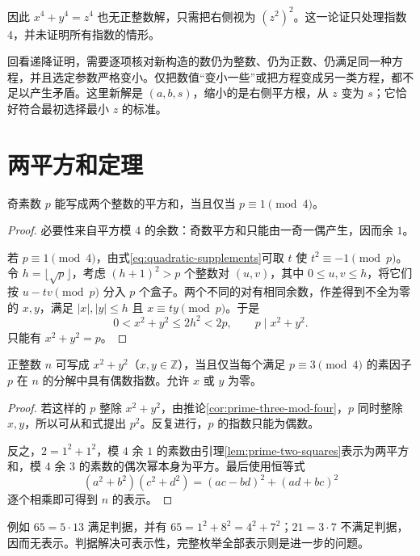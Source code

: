 \documentclass[UTF8,12pt,a4paper,fontset=fandol]{ctexbook}
\begin{document}
因此 $x^4+y^4=z^4$ 也无正整数解，只需把右侧视为 $(z^2)^2$。这一论证只处理指数 $4$，并未证明所有指数的情形。

回看递降证明，需要逐项核对新构造的数仍为整数、仍为正数、仍满足同一种方程，并且选定参数严格变小。仅把数值“变小一些”或把方程变成另一类方程，都不足以产生矛盾。这里新解是 $(a,b,s)$，缩小的是右侧平方根，从 $z$ 变为 $s$；它恰好符合最初选择最小 $z$ 的标准。

\section{两平方和定理}

\begin{lemma}
\label{lem:prime-two-squares}
奇素数 $p$ 能写成两个整数的平方和，当且仅当 $p\equiv1\pmod4$。
\end{lemma}
\begin{proof}
必要性来自平方模 $4$ 的余数：奇数平方和只能由一奇一偶产生，因而余 $1$。

若 $p\equiv1\pmod4$，由式\eqref{eq:quadratic-supplements}可取 $t$ 使 $t^2\equiv-1\pmod p$。令 $h=\lfloor\sqrt p\rfloor$，考虑 $(h+1)^2>p$ 个整数对 $(u,v)$，其中 $0\le u,v\le h$，将它们按 $u-tv\pmod p$ 分入 $p$ 个盒子。两个不同的对有相同余数，作差得到不全为零的 $x,y$，满足 $|x|,|y|\le h$ 且 $x\equiv ty\pmod p$。于是
\[
 0<x^2+y^2\le2h^2<2p,\qquad p\mid x^2+y^2.
\]
只能有 $x^2+y^2=p$。
\end{proof}

\begin{theorem}
\label{thm:two-squares}
正整数 $n$ 可写成 $x^2+y^2$（$x,y\in\mathbb Z$），当且仅当每个满足 $p\equiv3\pmod4$ 的素因子 $p$ 在 $n$ 的分解中具有偶数指数。允许 $x$ 或 $y$ 为零。
\end{theorem}
\begin{proof}
若这样的 $p$ 整除 $x^2+y^2$，由推论\ref{cor:prime-three-mod-four}，$p$ 同时整除 $x,y$，所以可从和式提出 $p^2$。反复进行，$p$ 的指数只能为偶数。

反之，$2=1^2+1^2$，模 $4$ 余 $1$ 的素数由引理\ref{lem:prime-two-squares}表示为两平方和，模 $4$ 余 $3$ 的素数的偶次幂本身为平方。最后使用恒等式
\begin{equation}
 (a^2+b^2)(c^2+d^2)=(ac-bd)^2+(ad+bc)^2
 \label{eq:two-square-product}
\end{equation}
逐个相乘即可得到 $n$ 的表示。
\end{proof}

例如 $65=5\cdot13$ 满足判据，并有 $65=1^2+8^2=4^2+7^2$；$21=3\cdot7$ 不满足判据，因而无表示。判据解决可表示性，完整枚举全部表示则是进一步的问题。
\end{document}

